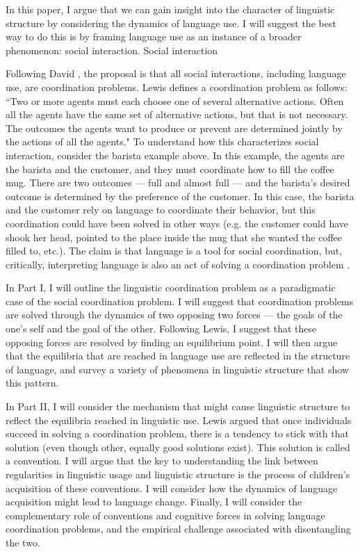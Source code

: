 \documentclass[man, noapacite, 12pt]{apa2}
\begin{document}
In this paper, I argue that we can gain  insight into the character of linguistic structure by considering the dynamics of language use. I will suggest the best way to do this is by framing language use as an instance of a broader phenomenon: social interaction. Social interaction  



Following David , the proposal is that all social interactions, including language use, are coordination problems. Lewis defines a coordination problem as follows: ``Two or more agents must each choose one of several alternative actions. Often all the agents have the same set of alternative actions, but that is not necessary. The outcomes the agents want to produce or prevent are determined jointly by the actions of all the agents." To understand how this characterizes social interaction, consider the barista example above. In this example, the agents are the barista and the customer, and they must coordinate how  to fill the coffee mug. There are two outcomes --- full and almost full --- and the barista's desired outcome is determined by the preference of the customer. In this case, the barista and the customer rely on language to coordinate their behavior, but this coordination could have been solved in other ways (e.g. the customer could have shook her head, pointed to the place inside the mug that she wanted the coffee filled to, etc.). The claim is that language is a tool for social coordination, but, critically, interpreting language is also an act of solving a coordination problem \cite{clark}.

In Part I, I will outline the linguistic coordination problem as a paradigmatic case of the social coordination problem. I will suggest that coordination problems are solved through the dynamics of two opposing two forces --- the goals of the one's self and the goal of the other. Following Lewis, I suggest that these opposing forces are resolved by finding an equilibrium point. I will then argue that the equilibria that are reached in language use are reflected in the structure of language, and survey a variety of phenomena in linguistic structure that show this pattern.

In Part II, I will consider the mechanism that might cause linguistic structure to reflect the equilibria reached in linguistic use. Lewis argued that once individuals succeed in solving a coordination problem, there is a tendency to stick with that solution (even though other, equally good solutions exist). This solution is called a convention. I will argue that the key to understanding the link between regularities in linguistic usage and linguistic structure is the process of children's acquisition of these conventions. I will consider how the dynamics of language acquisition might lead to language change. Finally, I will consider the complementary role of conventions and cognitive forces in solving language coordination problems, and the  empirical challenge associated with disentangling the two.
\end{document}
